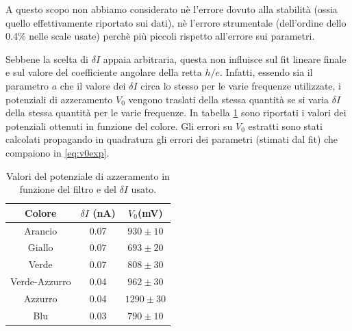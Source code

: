 \documentclass[10pt,a4paper]{article}
\begin{document}
A questo scopo non abbiamo considerato nè l'errore dovuto alla stabilità (ossia quello effettivamente riportato sui dati), nè  l'errore strumentale (dell'ordine dello 0.4\% nelle scale usate) perchè più piccoli rispetto all'errore sui parametri.

Sebbene la scelta di $\delta I$ appaia arbitraria, questa non influisce sul fit lineare finale e sul valore del coefficiente angolare della retta $h/e$. Infatti, essendo sia il parametro $a$ che il valore dei $\delta I$ circa lo stesso per le varie frequenze utilizzate, i potenziali di azzeramento $V_0$ vengono traslati della stessa quantità se si varia $\delta I$ della stessa quantità per le varie frequenze.
In tabella \ref{tab:V_0} sono riportati i valori dei potenziali ottenuti in funzione del colore. Gli errori su $V_0$ estratti sono stati calcolati propagando in quadratura gli errori dei parametri (stimati dal fit) che compaiono in \ref{eq:v0exp}.
\begin{table}[!htb]
\centering
\begin{tabular}{|c|c|c|}
\hline
Colore & $\delta I$ (nA) & $V_{0}$(mV)\\
\hline
Arancio & 0.07 & $930\pm 10$\\
\hline
Giallo & 0.07 & $693 \pm 20$\\
\hline
Verde & 0.07 & $808 \pm 30$\\
\hline
Verde-Azzurro & 0.04 & $962\pm 30$ \\
\hline
Azzurro & 0.04 & $1290 \pm 30$\\
\hline
Blu & 0.03 & $790 \pm 10$\\
\hline
\end{tabular}
\caption{Valori del potenziale di azzeramento in funzione del filtro e del $\delta I$ usato.\label{tab:V_0}}
\end{table}
\end{document}
